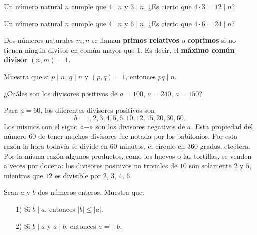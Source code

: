 \begin{ejercicio}
Un número natural $n$ cumple que $4\mid n$ y $3\mid n$. ¿Es cierto que $4\cdot 3=12\mid n$?
\end{ejercicio}

\begin{ejercicio}
Un número natural $n$ cumple que $4\mid n$ y $6\mid n$. ¿Es cierto que $4\cdot 6=24\mid n$?
\end{ejercicio}

Dos números naturales $m,n$ se llaman {\bf primos relativos} o {\bf coprimos} si no tienen ningún divisor en común mayor que $1$. Es decir, el {\bf máximo común divisor} $(n,m)=1$. 

\begin{ejercicio}
Muestra que si $p\mid n$, $q\mid n$ y $(p,q)=1$, entonces $pq\mid n$.
\end{ejercicio}

\begin{ejercicio}
¿Cuáles son los divisores positivos de $a=100$, $a=240$, $a=150$?
\end{ejercicio}

Para $a=60$, los diferentes divisores positivos son $$b = 1, 2, 3, 4, 5, 6, 10, 12, 15, 20, 30, 60.$$ Los mismos con el signo «$-$» son los divisores negativos de $a$. Esta propiedad del número $60$ de tener muchos divisores fue notada por los babilonios. Por esta razón la hora todavía se divide en $60$ minutos, el círculo en $360$ grados, etcétera. Por la misma razón algunos productos, como los huevos o las tortillas, se venden a veces por docena: los divisores positivos no triviales de $10$ son solamente $2$ y $5$, mientras que $12$ es divisible por $2$, $3$, $4$, $6$.

\begin{ejercicio}
  Sean $a$ y $b$ dos números enteros. Muestra que:

  \begin{enumerate}
  \item[1)] Si $b \mid a$, entonces $|b| \le |a|$.

  \item[2)] Si $b \mid a$ y $a \mid b$, entonces $a = \pm b$.
  \end{enumerate}
\end{ejercicio}


